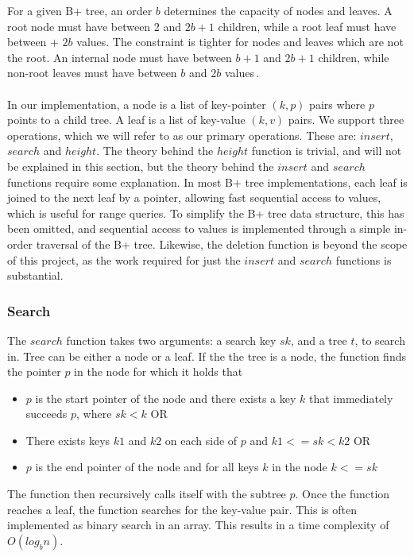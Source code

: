 For a given B+ tree, an order $b$ determines the capacity of nodes and leaves. A root node must have between 2 and $2b+1$ children, while a root leaf must have between + $2b$ values. The constraint is tighter for nodes and leaves which are not the root. An internal node must have between $b+1$ and $2b+1$ children, while non-root leaves must have between $b$ and $2b$ values\,\cite[p. 335]{ramakrishnan2003database}. 

\paragraph{}
In our implementation, a node is a list of key-pointer $(k, p)$ pairs where $p$ points to a child tree. A leaf is a list of key-value $(k, v)$ pairs. We support three operations, which we will refer to as our primary operations. These are: $insert$, $search$ and $height$. The theory behind the $height$ function is trivial, and will not be explained in this section, but the theory behind the $insert$ and $search$ functions require some explanation. In most B+ tree implementations, each leaf is joined to the next leaf by a pointer, allowing fast sequential access to values, which is useful for range queries. To simplify the B+ tree data structure, this has been omitted, and sequential access to values is implemented through a simple in-order traversal of the B+ tree. Likewise, the deletion function is beyond the scope of this project, as the work required for just the $insert$ and $search$ functions is substantial.

\subsubsection{Search}
\label{subsec:Search}
The $search$ function takes two arguments: a search key $sk$, and a tree $t$, to search in. Tree can be either a node or a leaf. If the the tree is a node, the function finds the pointer $p$ in the node for which it holds that
\begin{itemize}
	\item $p$ is the start pointer of the node and there exists a key $k$ that immediately succeeds $p$, where $sk < k$ OR
	\item There exists keys $k1$ and $k2$ on each side of $p$ and $k1 <= sk < k2$ OR
	\item $p$ is the end pointer of the node and for all keys $k$ in the node $k <= sk$
\end{itemize}
The function then recursively calls itself with the subtree $p$. Once the function reaches a leaf, the function searches for the key-value pair. This is often implemented as binary search in an array. This results in a time complexity of $O(log_b n)$.

